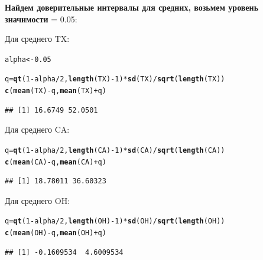 \documentclass{article}\usepackage[]{graphicx}\usepackage[]{color}
\makeatletter
\newcommand{\hlnum}[1]{\textcolor[rgb]{0.686,0.059,0.569}{#1}}%
\newcommand{\hlopt}[1]{\textcolor[rgb]{0,0,0}{#1}}%
\newcommand{\hlstd}[1]{\textcolor[rgb]{0.345,0.345,0.345}{#1}}%
\newcommand{\hlkwb}[1]{\textcolor[rgb]{0.69,0.353,0.396}{#1}}%
\newcommand{\hlkwd}[1]{\textcolor[rgb]{0.737,0.353,0.396}{\textbf{#1}}}%
\newenvironment{kframe}{%
 \def\at@end@of@kframe{}%
 \ifinner\ifhmode%
  \def\at@end@of@kframe{\end{minipage}}%
  \begin{minipage}{\columnwidth}%
 \fi\fi%
 \def\FrameCommand##1{\hskip\@totalleftmargin \hskip-\fboxsep
 \colorbox{shadecolor}{##1}\hskip-\fboxsep
     \hskip-\linewidth \hskip-\@totalleftmargin \hskip\columnwidth}%
 \MakeFramed {\advance\hsize-\width
   \@totalleftmargin\z@ \linewidth\hsize
   \@setminipage}}%
 {\par\unskip\endMakeFramed%
 \at@end@of@kframe}
\newenvironment{knitrout}{}{} %
\makeatother
\begin{document}
\newpage

\textbf{Найдем доверительные интервалы для средних, возьмем уровень значимости} \alpha = 0.05:

Для среднего TX:

\begin{knitrout}
\color{fgcolor}\begin{kframe}
\begin{alltt}
\hlstd{alpha} \hlkwb{<-} \hlnum{0.05}

\hlstd{q} \hlkwb{=} \hlkwd{qt}\hlstd{(}\hlnum{1} \hlopt{-} \hlstd{alpha}\hlopt{/}\hlnum{2}\hlstd{,} \hlkwd{length}\hlstd{(TX)} \hlopt{-} \hlnum{1}\hlstd{)} \hlopt{*} \hlkwd{sd}\hlstd{(TX)}\hlopt{/}\hlkwd{sqrt}\hlstd{(}\hlkwd{length}\hlstd{(TX))}
\hlkwd{c}\hlstd{(}\hlkwd{mean}\hlstd{(TX)} \hlopt{-} \hlstd{q,} \hlkwd{mean}\hlstd{(TX)} \hlopt{+} \hlstd{q)}
\end{alltt}
\begin{verbatim}
## [1] 16.6749 52.0501
\end{verbatim}
\end{kframe}
\end{knitrout}
Для среднего CA:

\begin{knitrout}
\color{fgcolor}\begin{kframe}
\begin{alltt}
\hlstd{q} \hlkwb{=} \hlkwd{qt}\hlstd{(}\hlnum{1} \hlopt{-} \hlstd{alpha}\hlopt{/}\hlnum{2}\hlstd{,} \hlkwd{length}\hlstd{(CA)} \hlopt{-} \hlnum{1}\hlstd{)} \hlopt{*} \hlkwd{sd}\hlstd{(CA)}\hlopt{/}\hlkwd{sqrt}\hlstd{(}\hlkwd{length}\hlstd{(CA))}
\hlkwd{c}\hlstd{(}\hlkwd{mean}\hlstd{(CA)} \hlopt{-} \hlstd{q,} \hlkwd{mean}\hlstd{(CA)} \hlopt{+} \hlstd{q)}
\end{alltt}
\begin{verbatim}
## [1] 18.78011 36.60323
\end{verbatim}
\end{kframe}
\end{knitrout}
Для среднего OH:

\begin{knitrout}
\color{fgcolor}\begin{kframe}
\begin{alltt}
\hlstd{q} \hlkwb{=} \hlkwd{qt}\hlstd{(}\hlnum{1} \hlopt{-} \hlstd{alpha}\hlopt{/}\hlnum{2}\hlstd{,} \hlkwd{length}\hlstd{(OH)} \hlopt{-} \hlnum{1}\hlstd{)} \hlopt{*} \hlkwd{sd}\hlstd{(OH)}\hlopt{/}\hlkwd{sqrt}\hlstd{(}\hlkwd{length}\hlstd{(OH))}
\hlkwd{c}\hlstd{(}\hlkwd{mean}\hlstd{(OH)} \hlopt{-} \hlstd{q,} \hlkwd{mean}\hlstd{(OH)} \hlopt{+} \hlstd{q)}
\end{alltt}
\begin{verbatim}
## [1] -0.1609534  4.6009534
\end{verbatim}
\end{kframe}
\end{knitrout}
\end{document}
